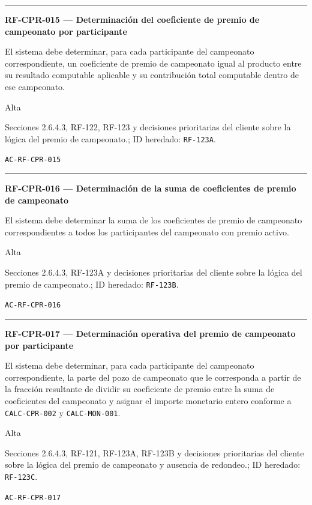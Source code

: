 \documentclass[10pt,letterpaper]{article}
\begin{document}
\vspace{0.25em}\hrule\vspace{0.65em}
\noindent\textbf{RF-CPR-015 --- Determinación del coeficiente de premio de campeonato por participante}\par
\begin{description}[style=nextline,leftmargin=3.15cm,labelwidth=2.8cm,font=\normalfont\bfseries]
\item[Obligación] El sistema debe determinar, para cada participante del campeonato correspondiente, un coeficiente de premio de campeonato igual al producto entre su resultado computable aplicable y su contribución total computable dentro de ese campeonato.
\item[Prioridad] Alta
\item[Procedencia] Secciones 2.6.4.3, RF-122, RF-123 y decisiones prioritarias del cliente sobre la lógica del premio de campeonato.; ID heredado: \texttt{RF-123A}.
\item[Verificación] \texttt{AC-RF-CPR-015}
\end{description}
\vspace{0.25em}\hrule\vspace{0.65em}
\noindent\textbf{RF-CPR-016 --- Determinación de la suma de coeficientes de premio de campeonato}\par
\begin{description}[style=nextline,leftmargin=3.15cm,labelwidth=2.8cm,font=\normalfont\bfseries]
\item[Obligación] El sistema debe determinar la suma de los coeficientes de premio de campeonato correspondientes a todos los participantes del campeonato con premio activo.
\item[Prioridad] Alta
\item[Procedencia] Secciones 2.6.4.3, RF-123A y decisiones prioritarias del cliente sobre la lógica del premio de campeonato.; ID heredado: \texttt{RF-123B}.
\item[Verificación] \texttt{AC-RF-CPR-016}
\end{description}
\vspace{0.25em}\hrule\vspace{0.65em}
\noindent\textbf{RF-CPR-017 --- Determinación operativa del premio de campeonato por participante}\par
\begin{description}[style=nextline,leftmargin=3.15cm,labelwidth=2.8cm,font=\normalfont\bfseries]
\item[Obligación] El sistema debe determinar, para cada participante del campeonato correspondiente, la parte del pozo de campeonato que le corresponda a partir de la fracción resultante de dividir su coeficiente de premio entre la suma de coeficientes del campeonato y asignar el importe monetario entero conforme a \texttt{CALC-CPR-002} y \texttt{CALC-MON-001}.
\item[Prioridad] Alta
\item[Procedencia] Secciones 2.6.4.3, RF-121, RF-123A, RF-123B y decisiones prioritarias del cliente sobre la lógica del premio de campeonato y ausencia de redondeo.; ID heredado: \texttt{RF-123C}.
\item[Verificación] \texttt{AC-RF-CPR-017}
\end{description}
\end{document}
